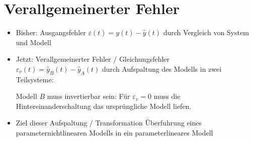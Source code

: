 \documentclass[ngerman]{tudscrreprt}
\begin{document}
\section{Verallgemeinerter Fehler}
\begin{itemize}
\item Bisher: Ausgangsfehler $ \varepsilon(t) = y(t)- \hat y(t) $ durch Vergleich von System und Modell 
\item Jetzt: Verallgemeinerter Fehler / Gleichungsfehler\\
$ 
\varepsilon_v(t) = \hat y_B(t) - \hat y_A(t)
$
durch Aufspaltung des Modells in zwei Teilsysteme: \\
\begin{figure}[H] 
	\centering 
	\def\svgwidth{200pt} 
	 
\end{figure} 
Modell $B$ muss invertierbar sein: Für $\varepsilon_v = 0$ muss die Hintereinanderschaltung das ursprüngliche Modell liefen. \\
\begin{figure}[H] 
	\centering 
	\def\svgwidth{200pt} 
	 
\end{figure} 
\item Ziel dieser Aufspaltung / Transformation
Überfuhrung eines parameternichtlinearen Modells in ein parameterlineares Modell
\end{itemize}
\end{document}
